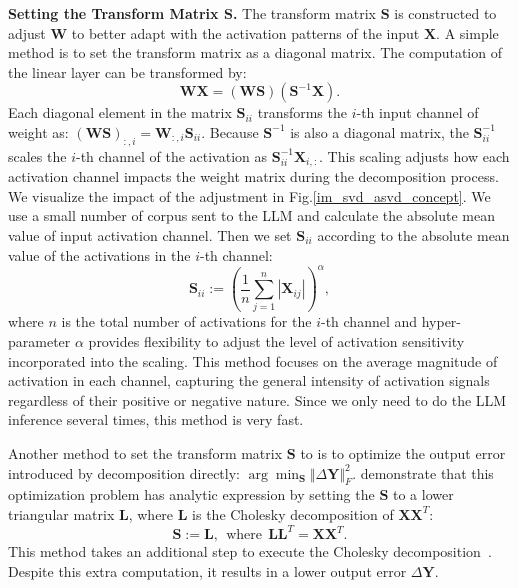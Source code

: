 \noindent\textbf{Setting the Transform Matrix $\mathbf{S}$.} 
The transform matrix $\mathbf{S}$ is constructed to adjust $\mathbf{W}$ to better adapt with the activation patterns of the input $\mathbf{X}$.
A simple method is to set the transform matrix as a diagonal matrix.
The computation of the linear layer can be transformed by:
\begin{equation}
    \mathbf{W}\mathbf{X}
    = (\mathbf{WS})(\mathbf{S}^{-1}\mathbf{X}).
\end{equation}
Each diagonal element in the matrix $\mathbf{S}_{ii}$ transforms the $i$-th input channel of weight as: $(\mathbf{WS})_{:,i}=\mathbf{W}_{:,i}\mathbf{S}_{ii}$. Because $\mathbf{S}^{-1}$ is also a diagonal matrix, the $\mathbf{S}_{ii}^{-1}$ scales the $i$-th channel of the activation as $\mathbf{S}^{-1}_{ii}\mathbf{X}_{i,:}$. This scaling adjusts how each activation channel impacts the weight matrix during the decomposition process. We visualize the impact of the adjustment in Fig.\ref{im_svd_asvd_concept}.
We use a small number of corpus sent to the LLM and calculate the absolute mean value of input activation channel. Then we set $\mathbf{S}_{ii}$ according to the absolute mean value of the activations in the $i$-th channel: 
\begin{equation}
\mathbf{S}_{ii} := (\frac{1}{n} \sum_{j=1}^{n} |\mathbf{X}_{ij}|)^\alpha,
\label{eq:set_matrix_magnitude}
\end{equation}
where $n$  is the total number of activations for the $i$-th channel and hyper-parameter $\alpha$ provides flexibility to adjust the level of activation sensitivity incorporated into the scaling. This method focuses on the average magnitude of activation in each channel, capturing the general intensity of activation signals regardless of their positive or negative nature. 
Since we only need to do the LLM inference several times, this method is very fast.

Another method to set the transform matrix $\mathbf{S}$ to is to optimize the output error introduced by decomposition directly:
$\arg\min_{\mathbf{S}}\Vert \Delta \mathbf{Y} \Vert_{F}^2$.
\citet{wang2024svdllm} demonstrate that this optimization problem has analytic expression by setting the $\mathbf{S}$ to a lower triangular matrix $\mathbf{L}$, where $\mathbf{L}$ is the Cholesky decomposition of $\mathbf{X}\mathbf{X}^T$:
\begin{equation}
    \mathbf{S}:= \mathbf{L},~~\text{where}~~
     \mathbf{L}\mathbf{L}^T= \mathbf{X}\mathbf{X}^T.
 \label{eq:set_matrix_cholosky}
\end{equation}
This method takes an additional step to execute the Cholesky decomposition~\citep{meyer2000cholesky}. Despite this extra computation, it results in a lower output error $\Delta \mathbf{Y}$.

